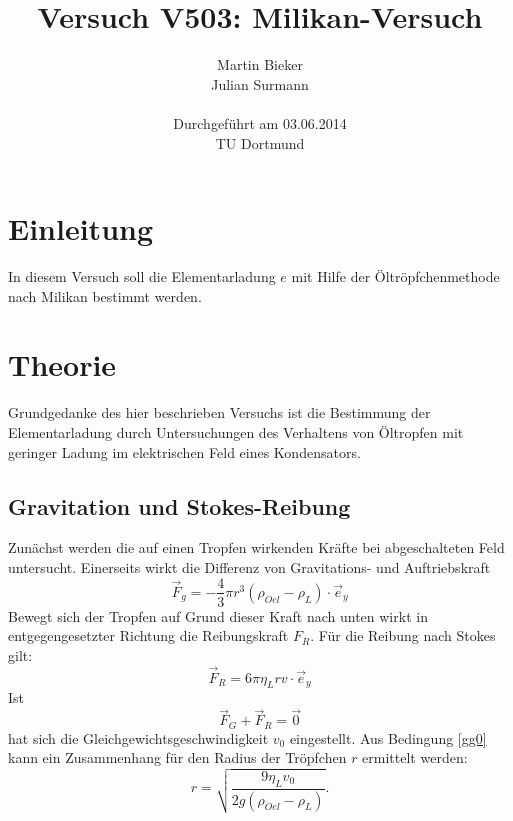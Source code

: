\documentclass[11pt,ngerman,a4paper]{article}
\title{\textbf{Versuch V503: Milikan-Versuch}}
\author{Martin Bieker\\
		Julian Surmann\\
		\\
		Durchgef\"{u}hrt am 03.06.2014\\
		TU Dortmund}
\date{}
\begin{document}
\renewcommand\tablename{Tabelle}
\renewcommand\figurename{Abbildung}
\maketitle
\thispagestyle{empty}
\newpage
\clearpage
\setcounter{page}{1}


\section{Einleitung}
In diesem Versuch soll die Elementarladung $e$ mit Hilfe der Öltröpfchenmethode nach Milikan bestimmt werden.
\section{Theorie}
Grundgedanke des hier beschrieben Versuchs ist die Bestimmung der Elementarladung durch Untersuchungen des Verhaltens von Öltropfen mit geringer Ladung im elektrischen Feld eines Kondensators. 
\subsection{Gravitation und Stokes-Reibung}
Zunächst werden die auf einen Tropfen wirkenden Kräfte bei abgeschalteten Feld untersucht. Einerseits wirkt die Differenz von Gravitations- und Auftriebskraft
\[
\vec F_g = -\frac43\pi r^3\left(\rho_{Oel}-\rho_{L}\right)\cdot \vec e_y
\]
Bewegt sich der Tropfen auf Grund dieser Kraft nach unten wirkt in entgegengesetzter Richtung die Reibungskraft $F_R$. Für die Reibung nach Stokes gilt:
\[
\vec F_R = 6\pi \eta_{L}rv \cdot \vec e_y
\]
Ist 
\begin{equation}
\vec F_G + \vec F_R = \vec 0
\label{gg0}
\end{equation}
hat sich die Gleichgewichtsgeschwindigkeit $v_0$  eingestellt. Aus Bedingung \ref{gg0} kann ein Zusammenhang für den Radius der Tröpfchen $r$ ermittelt werden:
\begin{equation}
r = \sqrt{\frac{9 \eta_L v_0}{2g\left(\rho_{Oel}-\rho_{L}\right)}}\mathrm{.}
\label{rv0}
\end{equation}
\end{document}
